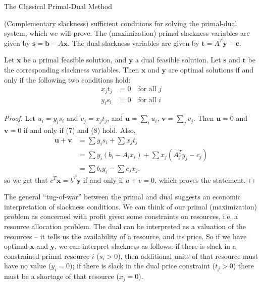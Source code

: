 \begin{section}{The Classical Primal-Dual Method}
\begin{definition}{(Complementary slackness)}
		sufficient conditions for solving the primal-dual system, which we will prove. The 
		(maximization) primal slackness variables are given by 
		$\mathbf{s} = \mathbf{b} - A\mathbf{x}$. The dual slackness variables are given by 
		$\mathbf{t} = A^{T}\mathbf{y} - \mathbf{c}$.
	\end{definition}
	\begin{theorem}
		Let $\mathbf{x}$ be a primal feasible solution, and $\mathbf{y}$ a dual feasible 
		solution. Let $\mathbf{s}$ and $\mathbf{t}$ be the corresponding slackness variables. 
		Then $\mathbf{x}$ and $\mathbf{y}$ are optimal solutions if and only if the following 
		two conditions hold:
		\begin{align}
			x_jt_j &= 0 \quad \text{for all } j \\
			y_is_i &= 0 \quad \text{for all } i
		\end{align}
	\end{theorem}
	\begin{proof}
		Let $u_i = y_is_i$ and $v_j = x_jt_j$, and $\mathbf{u} = \sum_i u_i$, 
		$\mathbf{v} = \sum_j v_j$. Then $\mathbf{u} = 0$ and $\mathbf{v} = 0$ if and only if 
		(7) and (8) hold. Also, 
		\begin{align*}
			\mathbf{u} + \mathbf{v} &= \sum y_is_i + \sum x_jt_j \\
						&= \sum y_i(b_i - A_ix_i) + \sum x_j (A^{T}_jy_j-c_j)\\
						&= \sum b_iy_i - \sum c_jx_j,
		\end{align*}
		so we get that $c^{T}\mathbf{x} = b^{T}\mathbf{y}$ if and only if $u + v = 0$, which 
		proves the statement.	
	\end{proof}
	The general ``tug-of-war'' between the primal and dual suggests an economic interpretation 
	of slackness conditions. We can think of our primal (maximization) problem as concerned with 
	profit given some constraints on resources, i.e. a resource allocation problem. The dual can 
	be interpreted as a valuation of the resources -- it tells us the availability of a resource, 
	and its price. So if we have optimal $\mathbf{x}$ and $\mathbf{y}$, we can interpret 
	slackness as follows: if there is slack in a constrained primal resource $i$ ($s_i > 0$), 
	then additional units of that resource must have no value ($y_i = 0$); if there is slack 
	in the dual price constraint ($t_j > 0$) there must be a shortage of that resource ($x_j = 0$).


\end{section}
